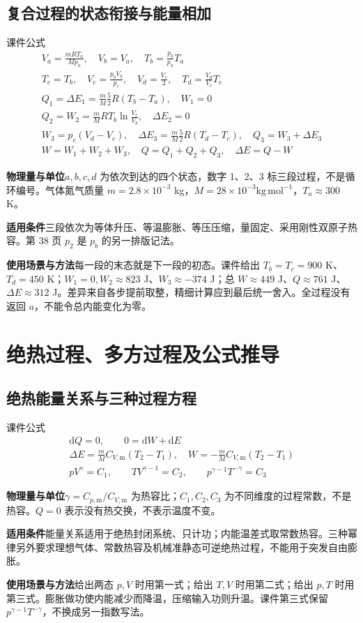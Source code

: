 \documentclass[UTF8,fontset=none,zihao=-4,a4paper]{ctexart}
\newcommand{\chapterpage}[1]{\clearpage\section{#1}}
\newcommand{\explain}[3]{\par\noindent\textbf{物理量与单位}\quad #1\par
\noindent\textbf{适用条件}\quad #2\par
\noindent\textbf{使用场景与方法}\quad #3\par}
\begin{document}
\par\noindent\begin{minipage}{\linewidth}
\subsection{复合过程的状态衔接与能量相加}
\begin{infobox}[breakable=false]{课件公式}
\begin{gather*}V_a=\frac{mRT_a}{Mp_a},\quad V_b=V_a,\quad T_b=\frac{p_b}{p_a}T_a\\T_c=T_b,\quad V_c=\frac{p_bV_b}{p_c},\quad V_d=\frac{V_c}2,\quad T_d=\frac{V_d}{V_c}T_c\\Q_1=\Delta E_1=\frac mM\frac52R(T_b-T_a),\quad W_1=0\\Q_2=W_2=\frac mM RT_b\ln\frac{V_c}{V_b},\quad\Delta E_2=0\\W_3=p_c(V_d-V_c),\quad\Delta E_3=\frac mM\frac52R(T_d-T_c),\quad Q_3=W_3+\Delta E_3\\W=W_1+W_2+W_3,\quad Q=Q_1+Q_2+Q_3,\quad\Delta E=Q-W\end{gather*}
\end{infobox}
\end{minipage}\par
\explain{$a,b,c,d$ 为依次到达的四个状态，数字 1、2、3 标三段过程，不是循环编号。气体氮气质量 $m=2.8\times10^{-3}$ kg，$M=28\times10^{-3}\mathrm{kg\,mol^{-1}}$，$T_a\approx300$ K。}{三段依次为等体升压、等温膨胀、等压压缩，量固定、采用刚性双原子热容。第 38 页 $p_2$ 是 $p_b$ 的另一排版记法。}{每一段的末态就是下一段的初态。课件给出 $T_b=T_c=900$ K、$T_d=450$ K；$W_1=0,W_2\approx823$ J、$W_3\approx-374$ J；总 $W\approx449$ J、$Q\approx761$ J、$\Delta E\approx312$ J。差异来自各步提前取整，精细计算应到最后统一舍入。全过程没有返回 $a$，不能令总内能变化为零。}


\chapterpage{绝热过程、多方过程及公式推导}
\par\noindent\begin{minipage}{\linewidth}
\subsection{绝热能量关系与三种过程方程}
\begin{infobox}[breakable=false]{课件公式}
\begin{gather*}\mathrm dQ=0,\qquad0=\mathrm dW+\mathrm dE\\\Delta E=\frac mM C_{V,\mathrm m}(T_2-T_1),\quad W=-\frac mM C_{V,\mathrm m}(T_2-T_1)\\pV^\gamma=C_1,\qquad TV^{\gamma-1}=C_2,\qquad p^{\gamma-1}T^{-\gamma}=C_3\end{gather*}
\end{infobox}
\end{minipage}\par
\explain{$\gamma=C_{p,\mathrm m}/C_{V,\mathrm m}$ 为热容比；$C_1,C_2,C_3$ 为不同维度的过程常数，不是热容。$Q=0$ 表示没有热交换，不表示温度不变。}{能量关系适用于绝热封闭系统、只计功；内能温差式取常数热容。三种幂律另外要求理想气体、常数热容及机械准静态可逆绝热过程，不能用于突发自由膨胀。}{给出两态 $p,V$ 时用第一式；给出 $T,V$ 时用第二式；给出 $p,T$ 时用第三式。膨胀做功使内能减少而降温，压缩输入功则升温。课件第三式保留 $p^{\gamma-1}T^{-\gamma}$，不换成另一指数写法。}
\end{document}

